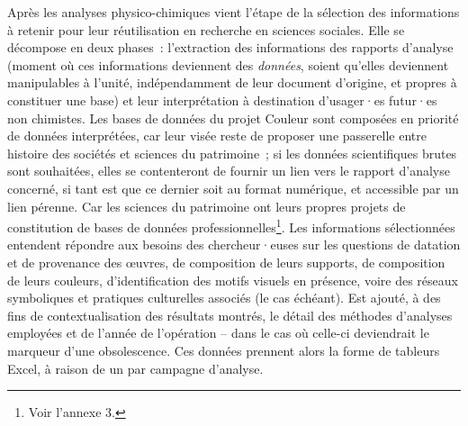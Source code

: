 \documentclass[a4paper,12pt, twoside]{book}
\begin{document}
Après les analyses physico-chimiques vient l’étape de la sélection des informations à retenir pour leur réutilisation en recherche en sciences sociales. Elle se décompose en deux phases~: l’extraction des informations des rapports d’analyse (moment où ces informations deviennent des \textit{données}, soient qu’elles deviennent manipulables à l’unité, indépendamment de leur document d’origine, et propres à constituer une base) et leur interprétation à destination d’usager·es futur·es non chimistes. Les bases de données du projet Couleur sont composées en priorité de données interprétées, car leur visée reste de proposer une passerelle entre histoire des sociétés et sciences du patrimoine~; si les données scientifiques brutes sont souhaitées, elles se contenteront de fournir un lien vers le rapport d’analyse concerné, si tant est que ce dernier soit au format numérique, et accessible par un lien pérenne. Car les sciences du patrimoine ont leurs propres projets de constitution de bases de données professionnelles\footnote{Voir l’annexe 3.}. Les informations sélectionnées entendent répondre aux besoins des chercheur·euses sur les questions de datation et de provenance des œuvres, de composition de leurs supports, de composition de leurs couleurs, d’identification des motifs visuels en présence, voire des réseaux symboliques et pratiques culturelles associés (le cas échéant). Est ajouté, à des fins de contextualisation des résultats montrés, le détail des méthodes d’analyses employées et de l’année de l’opération – dans le cas où celle-ci deviendrait le marqueur d’une obsolescence. Ces données prennent alors la forme de tableurs Excel, à raison de un par campagne d’analyse.
\end{document}

